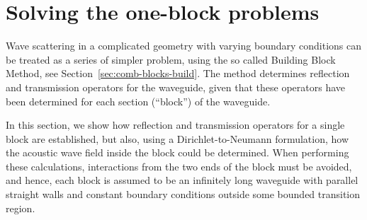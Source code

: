 \documentclass[numreferences]{kluwer}
\renewcommand{\Re}{\operatorname{Re}}
\renewcommand{\i}{\,\mathrm{i}}
\begin{document}


\section{Solving the one-block problems}
\label{sec:oneblock}

Wave scattering in a complicated geometry with varying boundary
conditions can be treated as a series of simpler problem, using the so
called Building Block Method, see
Section~\ref{sec:comb-blocks-build}. The method determines reflection
and transmission operators for the waveguide, given that these
operators have been determined for each section (``block'') of the
waveguide. 

In this section, we show how reflection and transmission operators for
a single block are established, but also, using a Dirichlet-to-Neumann
formulation, how the acoustic wave field inside the block could be
determined.  When performing these calculations, interactions from the
two ends of the block must be avoided, and hence, each block is
assumed to be an infinitely long waveguide with parallel straight
walls and constant boundary conditions outside some bounded transition
region.
\end{document}

